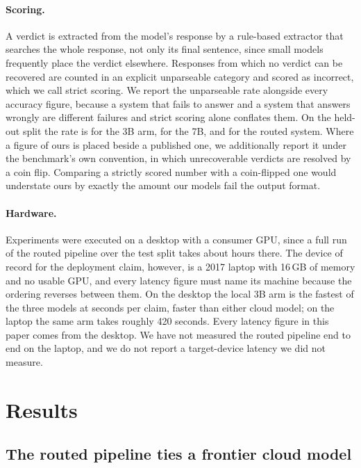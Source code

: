 \documentclass{article}
\begin{document}
\paragraph{Scoring.}
A verdict is extracted from the model's response by a rule-based extractor that searches the
whole response, not only its final sentence, since small models frequently place the verdict
elsewhere. Responses from which no verdict can be recovered are counted in an explicit
unparseable category and scored as incorrect, which we call strict scoring. We report the
unparseable rate alongside every accuracy figure, because a system that fails to answer and
a system that answers wrongly are different failures and strict scoring alone conflates
them. On the held-out split the rate is \unparseThreeB{} for the 3B arm, \unparseSevenB{}
for the 7B, and \unparseRouted{} for the routed system. Where a figure of ours is placed
beside a published one, we additionally report it under the benchmark's own convention, in
which unrecoverable verdicts are resolved by a coin flip. Comparing a strictly scored number
with a coin-flipped one would understate ours by exactly the amount our models fail the
output format.

\paragraph{Hardware.}
Experiments were executed on a desktop with a consumer GPU, since a full run of the routed
pipeline over the test split takes about \latRunHours{} hours there. The device of record
for the deployment claim, however, is a 2017 laptop with 16\,GB of memory and no usable
GPU, and every latency figure must name its machine because the ordering reverses between
them. On the desktop the local 3B arm is the fastest of the three models at
\latThreeBMed{} seconds per claim, faster than either cloud model; on the laptop the same
arm takes roughly 420 seconds. Every latency figure in this paper comes from the desktop.
We have not measured the routed pipeline end to end on the laptop, and we do not report a
target-device latency we did not measure.

\section{Results}
\label{sec:results}

\subsection{The routed pipeline ties a frontier cloud model}
\label{sec:headline}
\end{document}
